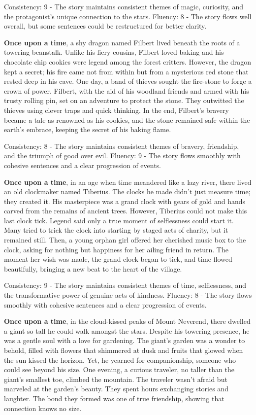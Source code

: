 \documentclass{article}
\begin{document}
Consistency: 9 - The story maintains consistent themes of magic, curiosity, and the protagonist's unique connection to the stars.
Fluency: 8 - The story flows well overall, but some sentences could be restructured for better clarity.

\textbf{Once upon a time}, a shy dragon named Filbert lived beneath the roots of a towering beanstalk. Unlike his fiery cousins, Filbert loved baking and his chocolate chip cookies were legend among the forest critters. However, the dragon kept a secret; his fire came not from within but from a mysterious red stone that rested deep in his cave. One day, a band of thieves sought the fire-stone to forge a crown of power. Filbert, with the aid of his woodland friends and armed with his trusty rolling pin, set on an adventure to protect the stone. They outwitted the thieves using clever traps and quick thinking. In the end, Filbert's bravery became a tale as renowned as his cookies, and the stone remained safe within the earth's embrace, keeping the secret of his baking flame.

Consistency: 8 - The story maintains consistent themes of bravery, friendship, and the triumph of good over evil.
Fluency: 9 - The story flows smoothly with cohesive sentences and a clear progression of events.

\textbf{Once upon a time}, in an age when time meandered like a lazy river, there lived an old clockmaker named Tiberius. The clocks he made didn't just measure time; they created it. His masterpiece was a grand clock with gears of gold and hands carved from the remains of ancient trees. However, Tiberius could not make this last clock tick. Legend said only a true moment of selflessness could start it. Many tried to trick the clock into starting by staged acts of charity, but it remained still. Then, a young orphan girl offered her cherished music box to the clock, asking for nothing but happiness for her ailing friend in return. The moment her wish was made, the grand clock began to tick, and time flowed beautifully, bringing a new beat to the heart of the village.

Consistency: 9 - The story maintains consistent themes of time, selflessness, and the transformative power of genuine acts of kindness.
Fluency: 8 - The story flows smoothly with cohesive sentences and a clear progression of events.

\textbf{Once upon a time}, in the cloud-kissed peaks of Mount Neverend, there dwelled a giant so tall he could walk amongst the stars. Despite his towering presence, he was a gentle soul with a love for gardening. The giant’s garden was a wonder to behold, filled with flowers that shimmered at dusk and fruits that glowed when the sun kissed the horizon. Yet, he yearned for companionship, someone who could see beyond his size. One evening, a curious traveler, no taller than the giant’s smallest toe, climbed the mountain. The traveler wasn't afraid but marveled at the garden's beauty. They spent hours exchanging stories and laughter. The bond they formed was one of true friendship, showing that connection knows no size.
\end{document}
